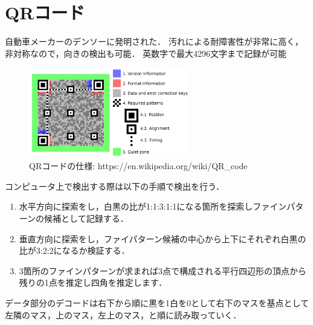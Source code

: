 \section{QRコード}
自動車メーカーのデンソーに発明された．
汚れによる耐障害性が非常に高く，非対称なので，向きの検出も可能．
英数字で最大4296文字まで記録が可能

\begin{figure}[htbp]
    \begin{center}
        \includegraphics[clip,width=7.0cm]{img/qrcode.png}
        \caption{QRコードの仕様: https://en.wikipedia.org/wiki/QR\_code }
    \end{center}
\end{figure}

コンピュータ上で検出する際は以下の手順で検出を行う．
\begin{enumerate}
    \item 水平方向に探索をし，白黒の比が1:1:3:1:1になる箇所を探索しファインパターンの候補として記録する．
    \item 垂直方向に探索をし，ファイパターン候補の中心から上下にそれぞれ白黒の比が3:2:2になるか検証する．
    \item 3箇所のファインパターンが求まれば3点で構成される平行四辺形の頂点から残りの1点を推定し四角を推定します．
\end{enumerate}

データ部分のデコードは右下から順に黒を1白を0として右下のマスを基点として左隣のマス，上のマス，左上のマス，と順に読み取っていく．